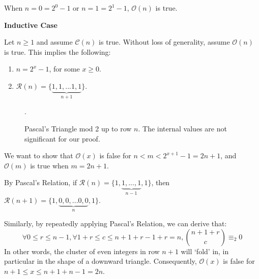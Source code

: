 \documentclass{article}
\newcommand{\pred}{\mathcal{O}}
\newcommand{\conject}{\mathcal{C}}
\newcommand{\modrow}{\mathcal{R}}
\newcommand{\drawemptyrow}[4]{
    \node at (#2/4, #3/4) {#4};
    \node at (#2/-4, #3/4) {#4};
  }
\newcommand{\drawrow}[4]{
  \drawemptyrow{#1}{#2}{#3}{#4}
  \foreach \i in {0,...,#1}{
    \node at (#2/-4-\i/-2,#3/4){#4};
  }
}
\newcommand{\drawoddtriangle}[2]{
  \foreach \i in {0,...,7}{
    \drawemptyrow{\i}{#1+0+\i}{#2+7-\i}{1}
   }
   \drawrow{7}{#1+7}{#2+21}{1}
  }
\begin{document}
When $n = 0 = 2^0-1$ or $n=1=2^1-1$, $\pred(n)$ is true.

\begin{center}\item\textbf{Inductive Case} \end{center}

Let $n\geq 1$ and assume $\conject(n)$ is true. Without loss of generality, assume $\pred(n)$ is true. This implies the following:
\begin{enumerate}
  \item $n = 2^x - 1$, for some $x \geq 0$.
  \item $\modrow(n) = \{\underbrace{1,1,...1,1}_{n+1}\}$.
\end{enumerate}

\begin{figure}[H]
\centering
{}
\caption {Pascal's Triangle mod 2 up to row $n$. The internal values are not significant for our proof.}.
\end{figure}

We want to show that $\pred(x)$ is false for $n < m < 2^{x+1}-1 = 2n+1$, and $\pred(m)$ is true when $m = 2n+1$.

By Pascal's Relation, if $\modrow(n) = \{1,\underbrace{1,...,1}_{n-1},1\}$, 
then $\modrow(n+1) = \{1,\underbrace{0,0,...0,0}_{n},1\}$.

\begin{figure}[H]
\centering
{}
\end{figure}

Similarly, by repeatedly applying Pascal's Relation, we can derive that:
$$
\forall 0 \leq r \leq n-1, \forall 1+r\leq c \leq n+1+r-1+r=n, {n+1+r \choose c} \equiv_2 0
$$
In other words, the cluster of even integers in row $n+1$ will `fold' in, in particular in the shape of a downward triangle. Consequently, $\pred(x)$ is false for $n+1\leq x \leq n+1+n-1 = 2n$.

\begin{figure}[H]
\centering
{}
\end{figure}
\end{document}
